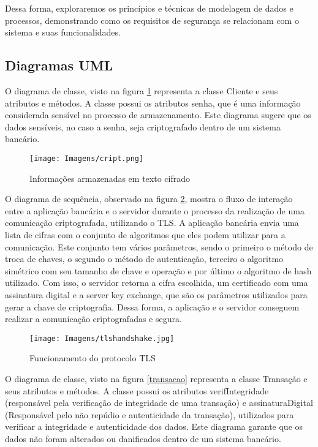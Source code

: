     Dessa forma, exploraremos os princípios e técnicas de modelagem de dados e processos, demonstrando como os requisitos de segurança se relacionam com o sistema e suas funcionalidades.
    
    \subsection{Diagramas UML}

    O diagrama de classe, visto na figura \ref{cript} representa a classe Cliente e seus atributos e métodos. A classe possui os atributos senha, que é uma informação considerada sensível no processo de armazenamento. Este diagrama sugere que os dados sensíveis, no caso a senha, seja criptografado dentro de um sistema bancário.

    \begin{figure}[H]
    \centering 
    \texttt{[image: Imagens/cript.png]} 
    \caption{Informações armazenadas em texto cifrado}
    \label{cript}
    \end{figure}

    O diagrama de sequência, observado na figura \ref{tls}, mostra o fluxo de interação entre a aplicação bancária e o servidor durante o processo da realização de uma comunicação criptografada, utilizando o TLS. A aplicação bancária envia uma lista de cifras com o conjunto de algoritmos que eles podem utilizar para a comunicação. Este conjunto tem vários parâmetros, sendo o primeiro o método de troca de chaves, o segundo o método de autenticação, terceiro o algoritmo simétrico com seu tamanho de chave e operação e por último o algoritmo de hash utilizado. Com isso, o servidor retorna a cifra escolhida, um certificado com uma assinatura digital e a server key exchange, que são os parâmetros utilizados para gerar a chave de criptografia. Dessa forma, a aplicação e o servidor conseguem realizar a comunicação criptografadas e segura.

    \begin{figure}[H]
    \centering 
    \texttt{[image: Imagens/tlshandshake.jpg]} 
    \caption{Funcionamento do protocolo TLS}
    \label{tls}
    \cite{tls2016}
    \end{figure}

    O diagrama de classe, visto na figura \ref{transacao} representa a classe Transação e seus atributos e métodos. A classe possui os atributos verifIntegridade (responsável pela verificação de integridade de uma transação) e assinaturaDigital (Responsável pelo não repúdio e autenticidade da transação), utilizados para verificar a integridade e autenticidade dos dados. Este diagrama garante que os dados não foram alterados ou danificados dentro de um sistema bancário.
    
